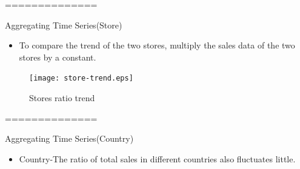 \documentclass[
 size=14pt,
 paper=smartboard,  %
 mode=present, 		%
 display=slides, 	%
 style=tuliplab,  	%
 pauseslide,
 fleqn,leqno]{powerdot}
\begin{document}
==============
\begin{slide}[toc=,bm=]{Aggregating Time Series(Store)}
	\begin{itemize}
		\item
		To compare the trend of the two stores, multiply the sales data of the two stores by a constant.
	\end{itemize}
			\begin{figure}
				\centering
				\texttt{[image: store-trend.eps]}
				\caption{Stores ratio trend}\label{fig:OutAspect-target}
			\end{figure}
\end{slide}

==============
\begin{slide}[toc=,bm=]{Aggregating Time Series(Country)}
	
	\begin{itemize}
		\bigskip
		\item
		Country-The ratio of total sales in different countries also fluctuates little.
	\end{itemize}
	\bigskip
	\begin{center}
	\end{center}
\end{slide}
\end{document}
